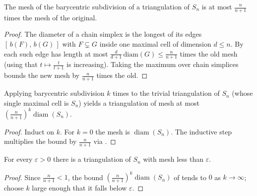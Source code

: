 \begin{lemma}
    \label{lem:barycentric-shrink}
    The mesh of the barycentric subdivision of a triangulation of $S_n$ is at
    most $\frac{n}{n+1}$ times the mesh of the original.
\end{lemma}
\begin{proof}
    The diameter of a chain simplex is the longest of its edges
    $[\,b(F),\,b(G)\,]$ with $F \subsetneq G$ inside one maximal cell of
    dimension $d \le n$. By  each such edge has
    length at most $\frac{d}{d+1}\,\mathrm{diam}(G) \le \frac{n}{n+1}$ times the
    old mesh (using that $t \mapsto \frac{t}{t+1}$ is increasing). Taking the
    maximum over chain simplices bounds the new mesh by $\frac{n}{n+1}$ times the
    old.
\end{proof}

\begin{lemma}
    \label{lem:iterated-subdivision}
    Applying barycentric subdivision $k$ times to the trivial triangulation of
    $S_n$ (whose single maximal cell is $S_n$) yields a triangulation of mesh at
    most $\left(\frac{n}{n+1}\right)^k \operatorname{diam}(S_n)$.
\end{lemma}
\begin{proof}
    Induct on $k$. For $k = 0$ the mesh is $\operatorname{diam}(S_n)$. The
    inductive step multiplies the bound by $\frac{n}{n+1}$ via
    .
\end{proof}

\begin{lemma}
    \label{lem:fine-triangulation}
    \leanok
    For every $\varepsilon > 0$ there is a triangulation of $S_n$ with mesh less
    than $\varepsilon$.
\end{lemma}
\begin{proof}
    Since $\frac{n}{n+1} < 1$, the bound
    $\left(\frac{n}{n+1}\right)^k \operatorname{diam}(S_n)$ of
     tends to $0$ as $k \to \infty$; choose $k$
    large enough that it falls below $\varepsilon$.
\end{proof}

